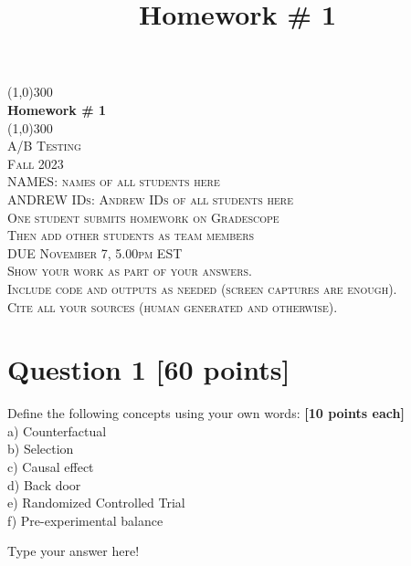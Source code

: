 \documentclass{article}
\title{Homework \# 1}
\begin{document}
\begin{titlepage}
	\begin{center}
    \line(1,0){300}\\
    [0.65cm]
	\huge{\bfseries Homework \# 1}\\
	\line(1,0){300}\\
	\textsc{\LARGE A/B Testing}\\
	\textsc{\LARGE  Fall 2023}\\
	[5.5cm]
	\textsc{\LARGE NAMES: names of all students here}\\
	\textsc{\LARGE ANDREW IDs: Andrew IDs of all students here}\\
	[1.5cm]
	\textsc{\LARGE One student submits homework on Gradescope}\\
	\textsc{\LARGE Then add other students as team members}\\
	[5.5cm]
	\textsc{DUE November 7, 5.00pm EST}\\
	[0.5cm]
	\textsc{\large Show your work as part of your answers.\\Include code and outputs as needed (screen captures are enough).\\Cite all your sources (human generated and otherwise).}\\
	\end{center}
\end{titlepage}

\section*{\color{black} Question 1 {\bf [60 points]}}

Define the following concepts using your own words: {\bf [10 points each]}\\

a) Counterfactual\\

b) Selection\\

c) Causal effect\\

d) Back door\\

e) Randomized Controlled Trial\\

f) Pre-experimental balance\\

\vspace{1cm}

{\color{blue}

Type your answer here!
}\\
\end{document}
